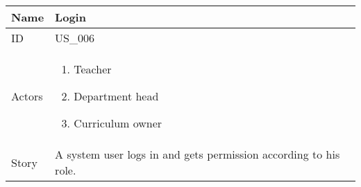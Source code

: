 \documentclass{article}
\newcommand\addrow[2]{#1 &#2\\ }
\newcommand\tabularhead{\begin{tabular}{lp{8cm}}
		\hline
	}
\newcommand\addmulrow[2]{ \begin{minipage}[t][][t]{2.5cm}#1\end{minipage}%
		&\begin{minipage}[t][][t]{8cm}
			\begin{enumerate} #2   \end{enumerate}
		\end{minipage}\\ }
\newenvironment{usecase}{\tabularhead}
	{\hline\end{tabular}}
\begin{document}
	\begin{usecase}
		\addrow{Name}{Login}
		\hline
		\addrow{ID}{US\_006}
		\hline
 		\addmulrow{Actors}{	\item Teacher
 							\item Department head
 							\item Curriculum owner}
		\hline		
		\addrow{Story}{A system user logs in and gets permission according to his role.}
								

	\end{usecase}
	
\end{document}
